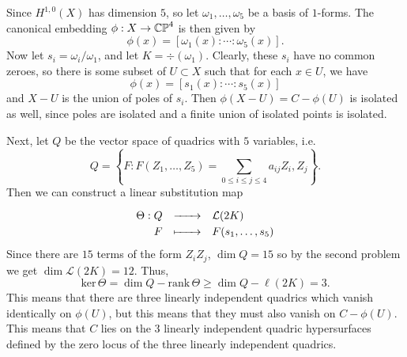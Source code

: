 \documentclass[expanded]{lkx_pset}
\begin{document}
\begin{solution}
	Since $H^{1,0}(X)$ has dimension $5$, so let $\omega_1,\ldots, \omega_5$ be a basis of $1$-forms. The canonical embedding $\phi : X \to \mathbb{CP}^4$ is then given by
	\[
		\phi(x) = [\omega_1(x) : \cdots : \omega_5(x)].
	\]
	Now let $s_i = \omega_i/\omega_1$, and let $K=\div(\omega_1)$. Clearly, these $s_i$ have no common zeroes, so there is some subset of $U\subset X$ such that for each $x\in U$, we have
	\[
		\phi(x) = [s_1(x) : \cdots : s_5(x)]
	\]
	and $X-U$ is the union of poles of $s_i$. Then $\phi(X-U)= C-\phi(U)$ is isolated as well, since poles are isolated and a finite union of isolated points is isolated.

	Next, let $Q$ be the vector space of quadrics with $5$ variables, i.e.
	\[
		Q = \left\{ F : F(Z_1, \ldots, Z_5) = \sum_{0\leq i \leq j\leq 4} a_{ij} Z_i, Z_j\right\}.
	\]
	Then we can construct a linear substitution map \[\definefunction{\Theta}{Q}{\mathcal{L}(2K)}{F}{F(s_1,\ldots, s_5)}\]
	Since there are $15$ terms of the form $Z_iZ_j$, $\dim Q = 15$ so by the second problem we get $\dim\mathcal{L}(2K)=12$. Thus,
	\[
		\textrm{ker}\, \Theta = \dim Q - \textrm{rank}\, \Theta \geq \dim Q - \ell(2K) = 3.
	\]
	This means that there are three linearly independent quadrics which vanish identically on $\phi(U)$, but this means that they must also vanish on $C-\phi(U)$. This means that $C$ lies on the $3$ linearly independent quadric hypersurfaces defined by the zero locus of the three linearly independent quadrics.
\end{solution}
\end{document}
